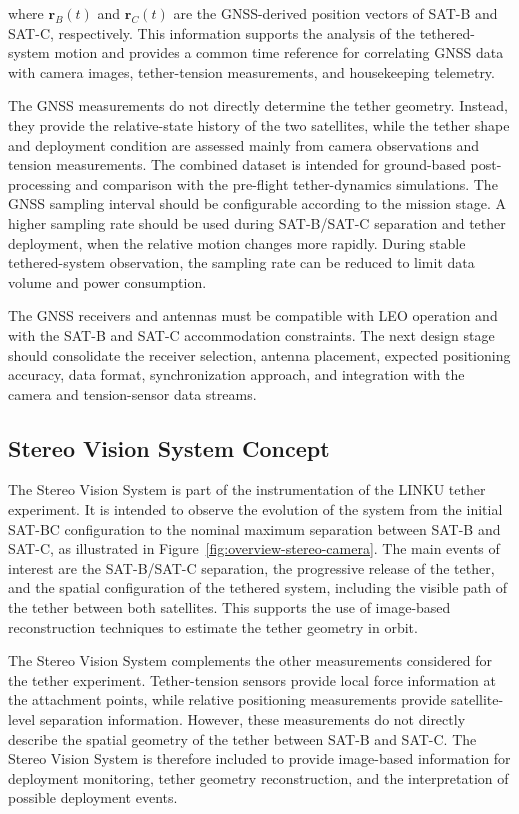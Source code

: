 where \(\mathbf{r}_{B}(t)\) and \(\mathbf{r}_{C}(t)\) are the GNSS-derived position vectors of SAT-B and SAT-C, respectively. This information supports the analysis of the tethered-system motion and provides a common time reference for correlating GNSS data with camera images, tether-tension measurements, and housekeeping telemetry.

The GNSS measurements do not directly determine the tether geometry. Instead, they provide the relative-state history of the two satellites, while the tether shape and deployment condition are assessed mainly from camera observations and tension measurements. The combined dataset is intended for ground-based post-processing and comparison with the pre-flight tether-dynamics simulations. The GNSS sampling interval should be configurable according to the mission stage. A higher sampling rate should be used during SAT-B/SAT-C separation and tether deployment, when the relative motion changes more rapidly. During stable tethered-system observation, the sampling rate can be reduced to limit data volume and power consumption.

The GNSS receivers and antennas must be compatible with LEO operation and with the SAT-B and SAT-C accommodation constraints. The next design stage should consolidate the receiver selection, antenna placement, expected positioning accuracy, data format, synchronization approach, and integration with the camera and tension-sensor data streams.

                    
\newpage
\subsection{Stereo Vision System Concept}
\label{sub:stereo_vision_concept}

The Stereo Vision System is part of the instrumentation of the LINKU tether experiment. It is intended to observe the evolution of the system from the initial SAT-BC configuration to the nominal maximum separation between SAT-B and SAT-C, as illustrated in Figure~\ref{fig:overview-stereo-camera}. The main events of interest are the SAT-B/SAT-C separation, the progressive release of the tether, and the spatial configuration of the tethered system, including the visible path of the tether between both satellites. This supports the use of image-based reconstruction techniques to estimate the tether geometry in orbit.

The Stereo Vision System complements the other measurements considered for the tether experiment. Tether-tension sensors provide local force information at the attachment points, while relative positioning measurements provide satellite-level separation information. However, these measurements do not directly describe the spatial geometry of the tether between SAT-B and SAT-C. The Stereo Vision System is therefore included to provide image-based information for deployment monitoring, tether geometry reconstruction, and the interpretation of possible deployment events.

